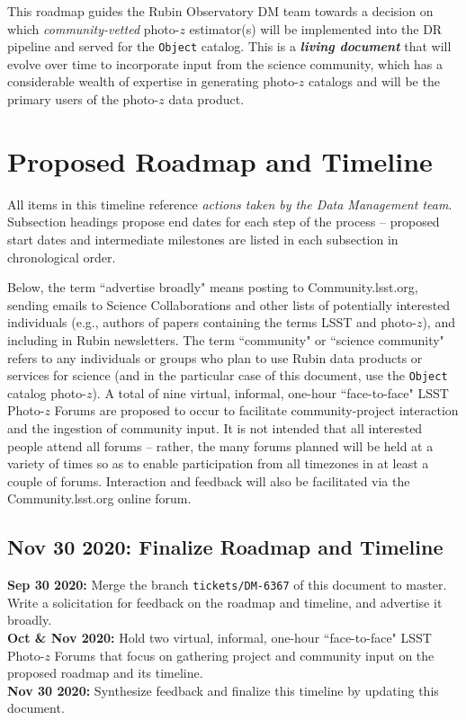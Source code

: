 \documentclass[DM,lsstdraft,toc]{lsstdoc}
\begin{document}
This roadmap guides the Rubin Observatory DM team towards a decision on which \textit{community-vetted} photo-$z$ estimator(s) will be implemented into the DR pipeline and served for the {\tt Object} catalog.
This is a \textit{\textbf{living document}} that will evolve over time to incorporate input from the science community, which has a considerable wealth of expertise in generating photo-$z$ catalogs and will be the primary users of the photo-$z$ data product.


\clearpage
\section{Proposed Roadmap and Timeline}\label{sec:time}

All items in this timeline reference {\it actions taken by the Data Management team}. 
Subsection headings propose end dates for each step of the process -- proposed start dates and intermediate milestones are listed in each subsection in chronological order.

Below, the term ``advertise broadly" means posting to Community.lsst.org, sending emails to Science Collaborations and other lists of potentially interested individuals (e.g., authors of papers containing the terms LSST and photo-$z$), and including in Rubin newsletters.
The term ``community" or ``science community" refers to any individuals or groups who plan to use Rubin data products or services for science (and in the particular case of this document, use the {\tt Object} catalog photo-$z$). 
A total of nine virtual, informal, one-hour ``face-to-face" LSST Photo-$z$ Forums are proposed to occur to facilitate community-project interaction and the ingestion of community input. 
It is not intended that all interested people attend all forums -- rather, the many forums planned will be held at a variety of times so as to enable participation from all timezones in at least a couple of forums.
Interaction and feedback will also be facilitated via the Community.lsst.org online forum. 

\subsection{Nov 30 2020: Finalize Roadmap and Timeline}\label{ssec:time_time}

{\bf Sep 30 2020:} Merge the branch {\tt tickets/DM-6367} of this document to master. Write a solicitation for feedback on the roadmap and timeline, and advertise it broadly. \\
{\bf Oct \& Nov 2020:} Hold two virtual, informal, one-hour ``face-to-face" LSST Photo-$z$ Forums that focus on gathering project and community input on the proposed roadmap and its timeline. \\
{\bf Nov 30 2020:} Synthesize feedback and finalize this timeline by updating this document.
\end{document}
